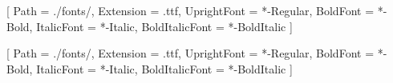 
[
    Path = ./fonts/,
    Extension = .ttf,
    UprightFont = *-Regular,
    BoldFont = *-Bold,
    ItalicFont = *-Italic,
    BoldItalicFont = *-BoldItalic
]

\setsansfont{NotoSans}[
    Path = ./fonts/,
    Extension = .ttf,
    UprightFont = *-Regular,
    BoldFont = *-Bold,
    ItalicFont = *-Italic,
    BoldItalicFont = *-BoldItalic
]
